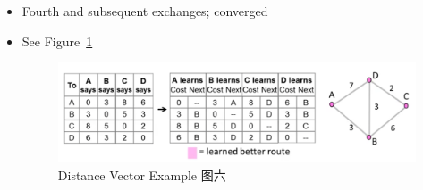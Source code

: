 \documentclass[12pt]{ctexart}   %
\begin{document}
\begin{itemize}
		 \item Fourth and subsequent exchanges; converged
		 \item See Figure~\ref{fig:5-4-6}
			
		\begin{figure}[h!] %
		\centering
		 \includegraphics[scale=0.7]{images/5-4-6}
		\caption{ Distance Vector Example 图六 }
		 \label{fig:5-4-6}
		 \end{figure}

	\end{itemize}
	
\end{document}
